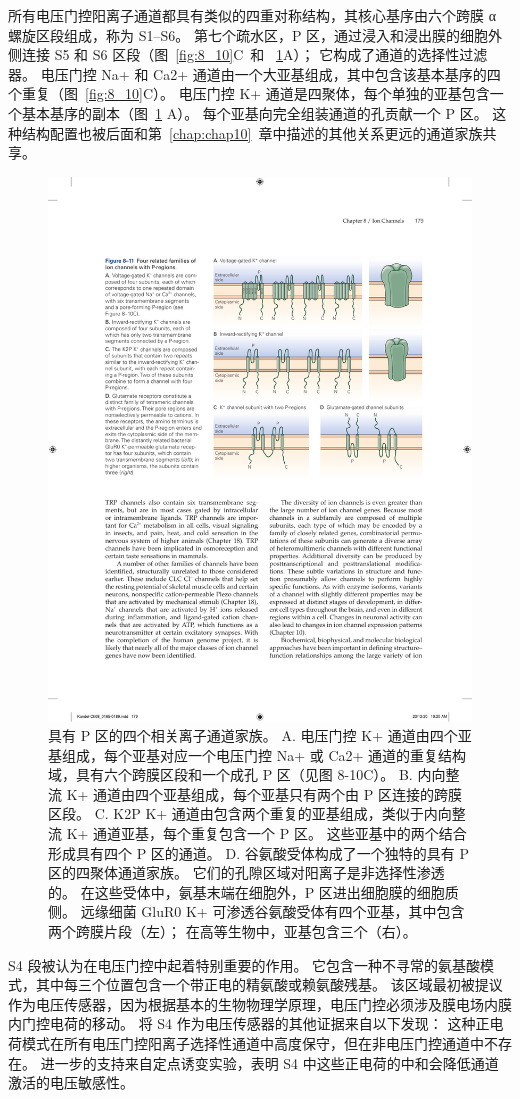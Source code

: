 所有电压门控阳离子通道都具有类似的四重对称结构，其核心基序由六个跨膜 α 螺旋区段组成，称为 S1–S6。
第七个疏水区，P 区，通过浸入和浸出膜的细胞外侧连接 S5 和 S6 区段（图~\ref{fig:8_10}C~和 ~\ref{fig:8_11}A）；
它构成了通道的选择性过滤器。
电压门控 Na+ 和 Ca2+ 通道由一个大亚基组成，其中包含该基本基序的四个重复（图~\ref{fig:8_10}C）。 
电压门控 K+ 通道是四聚体，每个单独的亚基包含一个基本基序的副本（图~\ref{fig:8_11} A）。
每个亚基向完全组装通道的孔贡献一个 P 区。
这种结构配置也被后面和第~\ref{chap:chap10}~章中描述的其他关系更远的通道家族共享。


\begin{figure}[htbp]
	\centering
	\includegraphics[width=0.7\linewidth]{chap08/fig_8_11}
	\caption{具有 P 区的四个相关离子通道家族。 A. 电压门控 K+ 通道由四个亚基组成，每个亚基对应一个电压门控 Na+ 或 Ca2+ 通道的重复结构域，具有六个跨膜区段和一个成孔 P 区（见图 8-10C）。 B. 内向整流 K+ 通道由四个亚基组成，每个亚基只有两个由 P 区连接的跨膜区段。 C. K2P K+ 通道由包含两个重复的亚基组成，类似于内向整流 K+ 通道亚基，每个重复包含一个 P 区。 这些亚基中的两个结合形成具有四个 P 区的通道。 D. 谷氨酸受体构成了一个独特的具有 P 区的四聚体通道家族。 它们的孔隙区域对阳离子是非选择性渗透的。 在这些受体中，氨基末端在细胞外，P 区进出细胞膜的细胞质侧。 远缘细菌 GluR0 K+ 可渗透谷氨酸受体有四个亚基，其中包含两个跨膜片段（左）； 在高等生物中，亚基包含三个（右）。}
	\label{fig:8_11}
\end{figure}


S4 段被认为在电压门控中起着特别重要的作用。
它包含一种不寻常的氨基酸模式，其中每三个位置包含一个带正电的精氨酸或赖氨酸残基。
该区域最初被提议作为电压传感器，因为根据基本的生物物理学原理，电压门控必须涉及膜电场内膜内门控电荷的移动。
将 S4 作为电压传感器的其他证据来自以下发现：
这种正电荷模式在所有电压门控阳离子选择性通道中高度保守，但在非电压门控通道中不存在。
进一步的支持来自定点诱变实验，表明 S4 中这些正电荷的中和会降低通道激活的电压敏感性。


